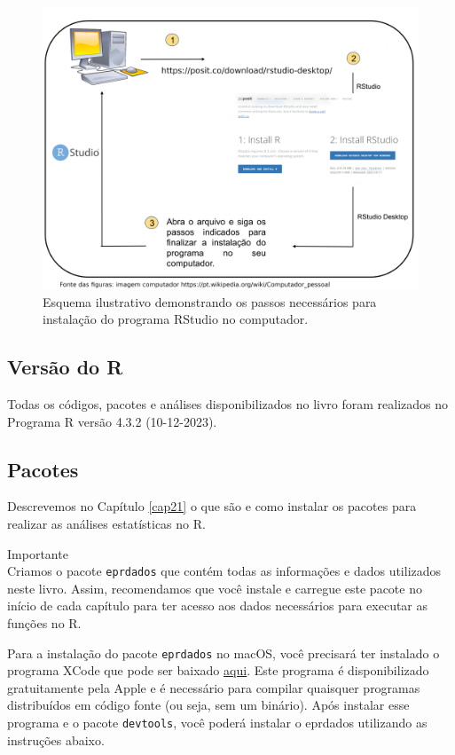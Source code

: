 \documentclass[
]{article}
\begin{document}
\begin{figure}

{\centering \includegraphics[width=0.75\linewidth,height=0.75\textheight]{figures/cap03_fig02} 

}

\caption{Esquema ilustrativo demonstrando os passos necessários para instalação do programa RStudio no computador.}\label{fig:fig-rstudio-instalacao}
\end{figure}

\hypertarget{versuxe3o-do-r}{%
\subsection{Versão do R}\label{versuxe3o-do-r}}

Todas os códigos, pacotes e análises disponibilizados no livro foram realizados no Programa R versão 4.3.2 (10-12-2023).

\hypertarget{pacotes-2}{%
\subsection{Pacotes}\label{pacotes-2}}

Descrevemos no Capítulo \ref{cap21} o que são e como instalar os pacotes para realizar as análises estatísticas no R.

Importante \\
Criamos o pacote \texttt{eprdados} que contém todas as informações e dados utilizados neste livro. Assim, recomendamos que você instale e carregue este pacote no início de cada capítulo para ter acesso aos dados necessários para executar as funções no R.

Para a instalação do pacote \texttt{eprdados} no macOS, você precisará ter instalado o programa XCode que pode ser baixado \href{https://developer.apple.com/xcode/}{aqui}. Este programa é disponibilizado gratuitamente pela Apple e é necessário para compilar quaisquer programas distribuídos em código fonte (ou seja, sem um binário). Após instalar esse programa e o pacote \texttt{devtools}, você poderá instalar o eprdados utilizando as instruções abaixo.
\end{document}
